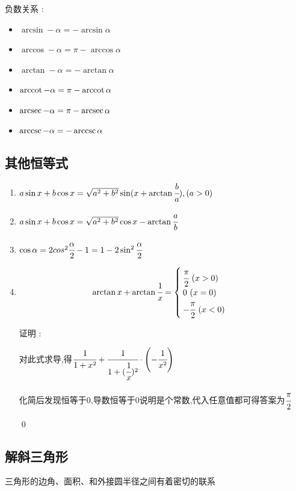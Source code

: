 {{  负数关系 :
  \begin{itemize}
    \item $\arcsin-\alpha = -\arcsin\alpha$
    \item $\arccos-\alpha = \pi - \arccos\alpha$
    \item $\arctan-\alpha = -\arctan\alpha$
    \item $\operatorname{arccot}-\alpha = \pi - \operatorname{arccot}\alpha$
    \item $\operatorname{arcsec}-\alpha = \pi - \operatorname{arcsec}\alpha$
    \item $\operatorname{arccsc}-\alpha = -\operatorname{arccsc}\alpha$
  \end{itemize}


  \subsection{其他恒等式}{
    \begin{enumerate}
      \item $a\sin x + b\cos x = \sqrt{a^2 + b^2}\sin(x + \arctan\cfrac{b}{a}),(a > 0)$
      \item $a\sin x + b\cos x = \sqrt{a^2 + b^2}\cos x - \arctan\cfrac{a}{b}$
      \item $\cos\alpha = 2cos^2\cfrac{\alpha}{2} - 1 = 1-2\sin^2\cfrac{\alpha}{2}$
      \item {
            $$
              \arctan x + \arctan\cfrac{1}{x} =
              \begin{cases}
                \cfrac{\pi}{2}\ (x > 0) \\
                0\ (x = 0)              \\
                -\cfrac{\pi}{2}\ (x < 0)
              \end{cases}
            $$

            证明 :

            对此式求导,得$\cfrac{1}{1 + x^2} + \cfrac{1}{1 + (\cfrac{1}{x})^2}\cdot\left(-\cfrac{1}{x^2}\right)$

            化简后发现恒等于0,导数恒等于0说明是个常数,代入任意值都可得答案为$\cfrac{\pi}{2}$

            \qed
            }
    \end{enumerate}

  }%

}%

\subsection{解斜三角形}{
三角形的边角、面积、和外接圆半径之间有着密切的联系

}}
